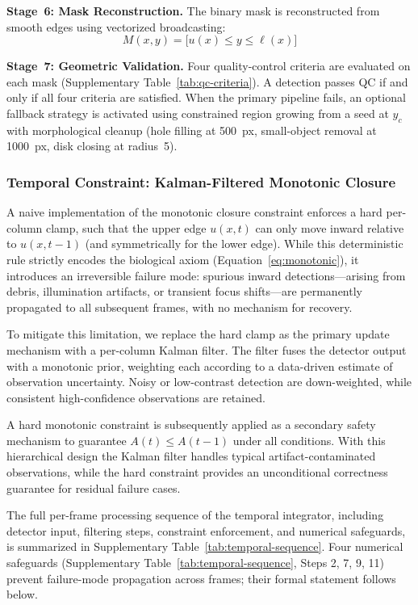 \textbf{Stage~6: Mask Reconstruction.}
The binary mask is reconstructed from smooth edges using vectorized broadcasting:
\begin{equation}
	M(x, y) = \bigl[u(x) \leq y \leq \ell(x)\bigr] 
	\label{eq:mask-reconstruction}
\end{equation}

\textbf{Stage~7: Geometric Validation.}
Four quality-control criteria are evaluated on each mask (Supplementary Table~\ref{tab:qc-criteria}). A detection passes QC if and only if all four criteria are satisfied.
When the primary pipeline fails, an optional fallback strategy is activated using constrained
region growing from a seed at $y_c$ with morphological cleanup
(hole filling at 500~px, small-object removal at 1000~px, disk closing at radius~5).



\subsubsection{Temporal Constraint: Kalman-Filtered Monotonic Closure}
\label{sec:temporal-constraint}

A naive implementation of the monotonic closure constraint enforces a hard per-column clamp, such that the upper edge $u(x,t)$ can only move inward relative to $u(x,t-1)$ (and symmetrically for the lower edge). While this deterministic rule strictly encodes the biological axiom (Equation~\ref{eq:monotonic}), it introduces an irreversible failure mode: spurious inward detections—arising from debris, illumination artifacts, or transient focus shifts—are permanently propagated to all subsequent frames, with no mechanism for recovery.

To mitigate this limitation, we replace the hard clamp as the primary update mechanism with a per-column Kalman filter. The filter fuses the detector output with a monotonic prior, weighting each according to a data-driven estimate of observation uncertainty. Noisy or low-contrast detection are down-weighted, while consistent high-confidence observations are retained. 

A hard monotonic constraint is subsequently applied as a secondary safety mechanism to guarantee $A(t) \leq A(t-1)$ under all conditions. With this hierarchical design the Kalman filter handles typical artifact-contaminated observations, while the hard constraint provides an unconditional correctness guarantee for residual failure cases. 

The full per-frame processing sequence of the temporal integrator, including detector input, filtering steps, constraint enforcement, and numerical safeguards, is summarized in Supplementary Table~\ref{tab:temporal-sequence}. Four numerical safeguards (Supplementary Table~\ref{tab:temporal-sequence}, Steps 2, 7, 9, 11) prevent failure-mode propagation across frames; their formal statement follows below.


